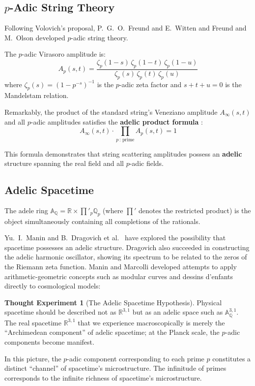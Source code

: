 \documentclass[12pt,a4paper]{article}
\theoremstyle{definition}
\newtheorem{thought}[definition]{Thought Experiment}
\begin{document}
\subsection{$p$-Adic String Theory}

Following Volovich's proposal, P.~G.~O.~Freund and E.~Witten \cite{FreundWitten1987} and Freund and M.~Olson \cite{FreundOlson1987} developed $p$-adic string theory.

The $p$-adic Virasoro amplitude is:
\begin{equation}
  A_p(s,t) = \frac{\zeta_p(1-s)\,\zeta_p(1-t)\,\zeta_p(1-u)}{\zeta_p(s)\,\zeta_p(t)\,\zeta_p(u)}
\end{equation}
where $\zeta_p(s) = (1 - p^{-s})^{-1}$ is the $p$-adic zeta factor and $s + t + u = 0$ is the Mandelstam relation.

Remarkably, the product of the standard string's Veneziano amplitude $A_\infty(s,t)$ and all $p$-adic amplitudes satisfies the \textbf{adelic product formula} \cite{FreundWitten1987}:
\begin{equation}
  A_\infty(s,t) \cdot \prod_{p\,:\,\text{prime}} A_p(s,t) = 1
\end{equation}

This formula demonstrates that string scattering amplitudes possess an \textbf{adelic} structure spanning the real field and all $p$-adic fields.

\subsection{Adelic Spacetime}

The adele ring $\mathbb{A}_\mathbb{Q} = \mathbb{R} \times \prod'_p \mathbb{Q}_p$ (where $\prod'$ denotes the restricted product) is the object simultaneously containing all completions of the rationals.

Yu.~I.~Manin \cite{Manin1989} and B.~Dragovich et al.~\cite{Dragovich2009, Dragovich2017} have explored the possibility that spacetime possesses an adelic structure. Dragovich \cite{Dragovich1995} also succeeded in constructing the adelic harmonic oscillator, showing its spectrum to be related to the zeros of the Riemann zeta function. Manin and Marcolli \cite{ManinMarcolli2014} developed attempts to apply arithmetic-geometric concepts such as modular curves and dessins d'enfants directly to cosmological models:

\begin{thought}[The Adelic Spacetime Hypothesis]
Physical spacetime should be described not as $\mathbb{R}^{3,1}$ but as an adelic space such as $\mathbb{A}_\mathbb{Q}^{3,1}$. The real spacetime $\mathbb{R}^{3,1}$ that we experience macroscopically is merely the ``Archimedean component'' of adelic spacetime; at the Planck scale, the $p$-adic components become manifest.

In this picture, the $p$-adic component corresponding to each prime $p$ constitutes a distinct ``channel'' of spacetime's microstructure. The infinitude of primes corresponds to the infinite richness of spacetime's microstructure.
\end{thought}
\end{document}

